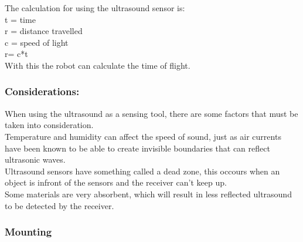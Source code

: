 The calculation for using the ultrasound sensor is: \\

t = time\\
r = distance travelled\\
c = speed of light\\

r= c*t\\

With this the robot can calculate the time of flight.\

\subsubsection{Considerations:}
When using the ultrasound as a sensing tool, there are some factors that must be taken into consideration.\\ Temperature and humidity can affect the speed of sound, just as air currents have been known to be able to create invisible boundaries that can reflect ultrasonic waves.\\
Ultrasound sensors have something called a dead zone, this occours when an object is infront of the sensors and the receiver can't keep up.\\
Some materials are very absorbent, which will result in less reflected ultrasound to be detected by the receiver.

\subsubsection{Mounting}



